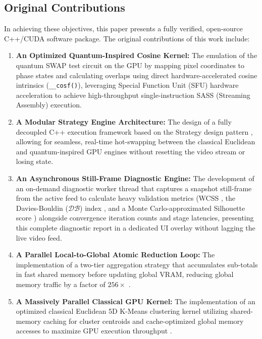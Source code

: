 \subsection{Original Contributions}
In achieving these objectives, this paper presents a fully verified, open-source C++/CUDA software package. The original contributions of this work include:
\begin{enumerate}
    \item \textbf{An Optimized Quantum-Inspired Cosine Kernel:} The emulation of the quantum SWAP test circuit \cite{buhrman2001quantum} on the GPU by mapping pixel coordinates to phase states and calculating overlaps using direct hardware-accelerated cosine intrinsics (\texttt{\_\_cosf()}), leveraging Special Function Unit (SFU) hardware acceleration \cite{CudaGuide} to achieve high-throughput single-instruction SASS (Streaming Assembly) execution.
    \item \textbf{A Modular Strategy Engine Architecture:} The design of a fully decoupled C++ execution framework based on the Strategy design pattern \cite{gamma1995design}, allowing for seamless, real-time hot-swapping between the classical Euclidean and quantum-inspired GPU engines without resetting the video stream or losing state.
    \item \textbf{An Asynchronous Still-Frame Diagnostic Engine:} The development of an on-demand diagnostic worker thread that captures a snapshot still-frame from the active feed to calculate heavy validation metrics (WCSS \cite{lloyd1982least,krzanowski1988criterion}, the Davies-Bouldin ($\mathcal{D}\mathcal{B}$) index \cite{davies1979cluster,xiao2017davies}, and a Monte Carlo-approximated Silhouette score \cite{rousseeuw1987silhouettes, shutaywi2021silhouette}) alongside convergence iteration counts and stage latencies, presenting this complete diagnostic report in a dedicated UI overlay without lagging the live video feed.
    \item \textbf{A Parallel Local-to-Global Atomic Reduction Loop:} The implementation of a two-tier aggregation strategy that accumulates sub-totals in fast shared memory before updating global VRAM, reducing global memory traffic by a factor of $256\times$ \cite{CudaGuide}.
    \item \textbf{A Massively Parallel Classical GPU Kernel:} The implementation of an optimized classical Euclidean 5D K-Means clustering kernel utilizing shared-memory caching for cluster centroids and cache-optimized global memory accesses to maximize GPU execution throughput \cite{CudaGuide}.

\end{enumerate}
